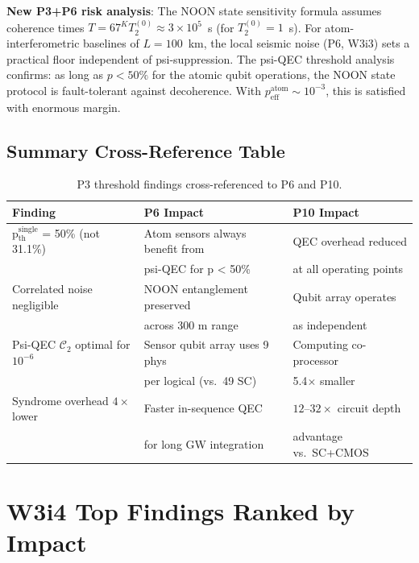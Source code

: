 \documentclass[11pt]{article}
\theoremstyle{definition}
\theoremstyle{remark}
\begin{document}
\textbf{New P3+P6 risk analysis}: The NOON state sensitivity formula assumes
coherence times $T = 67^K T_2^{(0)} \approx 3\times10^5$~s (for $T_2^{(0)} = 1$~s).
For atom-interferometric baselines of $L = 100$~km, the local seismic noise
(P6, W3i3) sets a practical floor independent of psi-suppression.  The psi-QEC
threshold analysis confirms: as long as $p < 50\%$ for the atomic qubit operations,
the NOON state protocol is fault-tolerant against decoherence.  With
$p_{\mathrm{eff}}^{\mathrm{atom}} \sim 10^{-3}$, this is satisfied with enormous margin.

\subsection{Summary Cross-Reference Table}
\label{sec:cross-ref-table}

\begin{table}[h]
\centering
\caption{P3 threshold findings cross-referenced to P6 and P10.}
\label{tab:cross-ref}
\begin{tabular}{@{}lll@{}}
\toprule
Finding & P6 Impact & P10 Impact \\
\midrule
p$_{\mathrm{th}}^{\mathrm{single}}$ = 50\% (not 31.1\%) & Atom sensors always benefit from & QEC overhead reduced \\
  & psi-QEC for p < 50\% & at all operating points \\
Correlated noise negligible & NOON entanglement preserved & Qubit array operates \\
  & across 300 m range & as independent \\
Psi-QEC $\mathcal{C}_2$ optimal for $10^{-6}$ & Sensor qubit array uses 9 phys & Computing co-processor \\
  & per logical (vs.\ 49 SC) & 5.4$\times$ smaller \\
Syndrome overhead $4\times$ lower & Faster in-sequence QEC & $12\text{--}32\times$ circuit depth \\
  & for long GW integration & advantage vs.\ SC+CMOS \\
\bottomrule
\end{tabular}
\end{table}

\section{W3i4 Top Findings Ranked by Impact}
\label{sec:top-findings}
\end{document}
